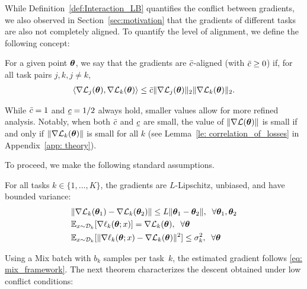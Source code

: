 While Definition~\ref{def:Interaction_LB} quantifies the conflict between gradients, we also observed in Section~\ref{sec:motivation} that the gradients of different tasks are also not completely aligned. To quantify the level of alignment, we define the following concept:

\begin{definition}\label{def:Interaction_UB}
   For a given point $\bm{\theta}$, we say that the gradients are $\bar{c}$-aligned (with $\bar{c}\geq 0$) if, for all task pairs $j,k, j\neq k$,
    \begin{align}
          \left\langle \nabla \mathcal{L}_j(\bm{\theta}) ,\nabla \mathcal{L}_k(\bm{\theta}) \right\rangle  \leq \bar{c} \|\nabla \mathcal{L}_j(\bm{\theta})\|_2 \|\nabla \mathcal{L}_k(\bm{\theta})\|_2. \nonumber
    \end{align}
\end{definition}
While \(\bar{c} = 1\) and \(\underline{c} = 1/2\) always hold, smaller values allow for more refined analysis. Notably, when both \(\bar{c}\) and \(\underline{c}\) are small, the value of \(\|\nabla \mathcal{L}(\bm{\theta})\|\) is small if and only if  \(\|\nabla \mathcal{L}_k(\bm{\theta})\|\) is small for all \( k \) (see Lemma~\ref{le: correlation_of_losses} in Appendix~\ref{app: theory}).  

%
To proceed, we make the following standard assumptions.




\begin{assumption}\label{as:assumption1}
For all tasks \(k \in \{1, \ldots, K\}\), the gradients are $L$-Lipschitz, unbiased, and have bounded variance:
\begin{align}
    & \|\nabla \mathcal{L}_k(\bm{\theta}_1) - \nabla \mathcal{L}_k(\bm{\theta}_2)\|\leq L\|\bm{\theta}_1 - \bm{\theta}_2\|, \;\;\forall \bm{\theta}_1,\bm{\theta}_2\\
    & \mathbb{E}_{x\sim \mathcal{D}_k}[\nabla \ell_k(\bm{\theta}; x)] = \nabla \mathcal{L}_k(\bm{\theta}), \;\;\forall \bm{\theta}\\
    & \mathbb{E}_{x\sim \mathcal{D}_k}[\|\nabla \ell_k(\bm{\theta};x) - \nabla\mathcal{L}_k(\bm{\theta})\|^2] \leq \sigma_k^2,\;\;\forall \bm{\theta}
\end{align}
\end{assumption}

Using a Mix batch with \( b_k \) samples per task~$k$, the estimated gradient follows \eqref{eq: mix_framework}. The next theorem characterizes the descent obtained under low conflict conditions:  


%

%




